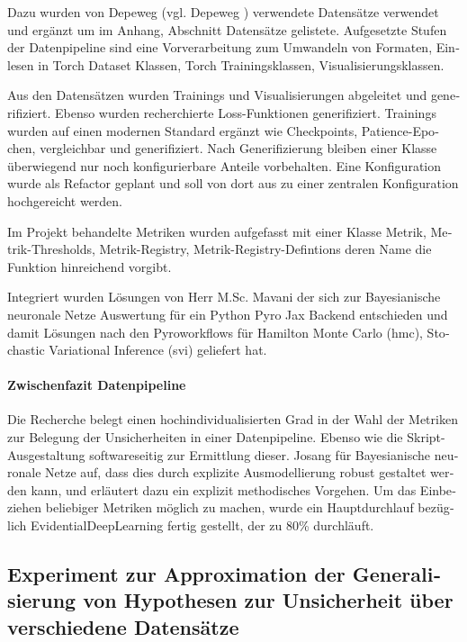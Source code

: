 \begin{otherlanguage}{ngerman}
Dazu wurden von Depeweg (vgl. Depeweg \parencite{Depeweg2019}) verwendete Datensätze verwendet und ergänzt um im Anhang, Abschnitt Datensätze gelistete. Aufgesetzte Stufen der Datenpipeline sind eine Vorverarbeitung zum Umwandeln von Formaten, Einlesen in Torch Dataset Klassen, Torch Trainingsklassen, Visualisierungsklassen.

Aus den Datensätzen wurden Trainings und Visualisierungen abgeleitet und generifiziert. Ebenso wurden recherchierte Loss-Funktionen generifiziert. Trainings wurden auf einen modernen Standard ergänzt wie Checkpoints, Patience-Epochen, vergleichbar und generifiziert. Nach Generifizierung bleiben einer Klasse überwiegend nur noch konfigurierbare Anteile vorbehalten. Eine Konfiguration wurde als Refactor geplant und soll von dort aus zu einer zentralen Konfiguration hochgereicht werden.

Im Projekt behandelte Metriken wurden aufgefasst mit einer Klasse Metrik, Metrik-Thresholds, Metrik-Registry, Metrik-Registry-Defintions deren Name die Funktion hinreichend vorgibt.

Integriert wurden Lösungen von Herr M.Sc. Mavani der sich zur \gls{Bayesianische neuronale Netze} Auswertung für ein Python Pyro Jax Backend entschieden und damit Lösungen nach den Pyroworkflows für Hamilton Monte Carlo (\gls{hmc}), Stochastic Variational Inference (\gls{svi}) geliefert hat.  

\paragraph{Zwischenfazit Datenpipeline} Die Recherche belegt einen hochindividualisierten Grad in der Wahl der Metriken zur Belegung der Unsicherheiten in einer Datenpipeline. Ebenso wie die Skript-Ausgestaltung softwareseitig zur Ermittlung dieser. Josang für \gls{Bayesianische neuronale Netze} auf, dass dies durch explizite Ausmodellierung robust gestaltet werden kann, und erläutert dazu ein explizit methodisches Vorgehen. Um das Einbeziehen beliebiger Metriken möglich zu machen, wurde ein Hauptdurchlauf bezüglich \gls{EvidentialDeepLearning} fertig gestellt, der zu 80\% durchläuft. 



\subsection*{Experiment zur Approximation der Generalisierung von Hypothesen zur Unsicherheit über verschiedene Datensätze}


\end{otherlanguage}
